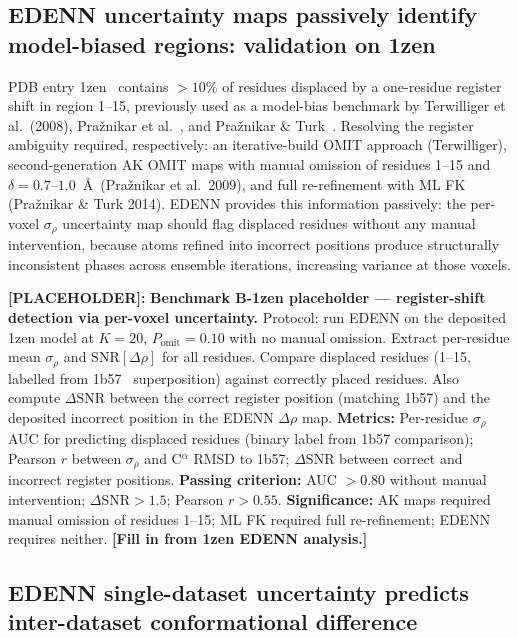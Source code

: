 \documentclass[10pt,twocolumn]{article}
\newcommand{\placeholder}[1]{%
  \begin{mdframed}[
    linecolor=placeholder,linewidth=1pt,
    backgroundcolor=red!5,
    innertopmargin=6pt,innerbottommargin=6pt,
    innerleftmargin=8pt,innerrightmargin=8pt]
  \small\color{placeholder}\textbf{[PLACEHOLDER]:} #1
  \end{mdframed}
}
\begin{document}
\subsection{EDENN uncertainty maps passively identify model-biased
regions: validation on 1zen}

PDB entry 1zen~\cite{cooper1996} contains $>10\%$ of residues
displaced by a one-residue register shift in region 1--15, previously
used as a model-bias benchmark by Terwilliger et al.~(2008),
Pra\v{z}nikar et al.~\cite{praznk2009}, and
Pra\v{z}nikar \& Turk~\cite{praznk2014}.
Resolving the register ambiguity required, respectively: an
iterative-build OMIT approach (Terwilliger), second-generation AK
OMIT maps with manual omission of residues 1--15 and
$\delta = 0.7$--$1.0$~\AA\ (Pra\v{z}nikar et al.\ 2009), and
full re-refinement with ML FK (Pra\v{z}nikar \& Turk 2014).
EDENN provides this information passively: the per-voxel
$\sigma_\rho$ uncertainty map should flag displaced residues
without any manual intervention, because atoms refined into
incorrect positions produce structurally inconsistent phases across
ensemble iterations, increasing variance at those voxels.

\placeholder{
\textbf{Benchmark B-1zen placeholder --- register-shift detection
via per-voxel uncertainty.}
Protocol: run EDENN on the deposited 1zen model at $K=20$,
$P_\mathrm{omit}=0.10$ with no manual omission.
Extract per-residue mean $\sigma_\rho$ and
$\mathrm{SNR}[\Delta\rho]$ for all residues.
Compare displaced residues (1--15, labelled from 1b57~\cite{hall1999}
superposition) against correctly placed residues.
Also compute $\Delta\mathrm{SNR}$ between the correct register
position (matching 1b57) and the deposited incorrect position in
the EDENN $\Delta\rho$ map.
\textbf{Metrics:}
Per-residue $\sigma_\rho$ AUC for predicting displaced residues
(binary label from 1b57 comparison);
Pearson $r$ between $\sigma_\rho$ and C$^\alpha$ RMSD to 1b57;
$\Delta\mathrm{SNR}$ between correct and incorrect register positions.
\textbf{Passing criterion:}
AUC $>0.80$ without manual intervention;
$\Delta\mathrm{SNR} > 1.5$; Pearson $r > 0.55$.
\textbf{Significance:} AK maps required manual omission of residues
1--15; ML FK required full re-refinement; EDENN requires neither.
\textbf{[Fill in from 1zen EDENN analysis.]}
}

\subsection{EDENN single-dataset uncertainty predicts inter-dataset
conformational difference}
\end{document}
